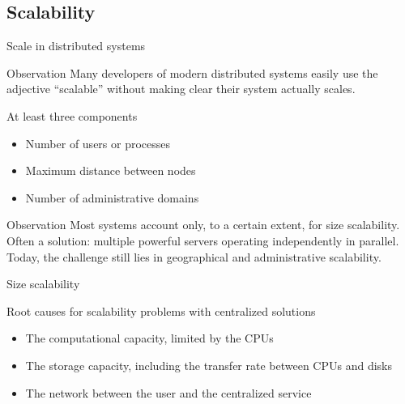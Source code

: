 \subsection{Scalability}
\begin{slide}{Scale in distributed systems}
  \begin{block}{Observation}
    Many developers  of modern distributed systems easily  use the adjective ``scalable''  without making clear
     their system actually scales.
  \end{block}
  \onslide
  \begin{block}{At least three components}
    \begin{itemize}
    \item Number of users or processes 
    \item Maximum distance between nodes 
    \item Number of administrative domains 
    \end{itemize}
  \end{block}
  \onslide
  \begin{alertblock}{Observation}
    Most systems account only, to a certain extent, for size scalability. Often a solution: multiple powerful
    servers operating independently in parallel. Today, the challenge still lies in geographical and
    administrative scalability.
  \end{alertblock}
\end{slide}
\begin{slide}{Size scalability}
  \begin{block}{Root causes for scalability problems with centralized solutions}
    \begin{itemize}
    \item The computational capacity, limited by the CPUs
    \item The storage capacity, including the transfer rate between CPUs and disks
    \item The network between the user and the centralized service
    \end{itemize}
  \end{block}
\end{slide}
